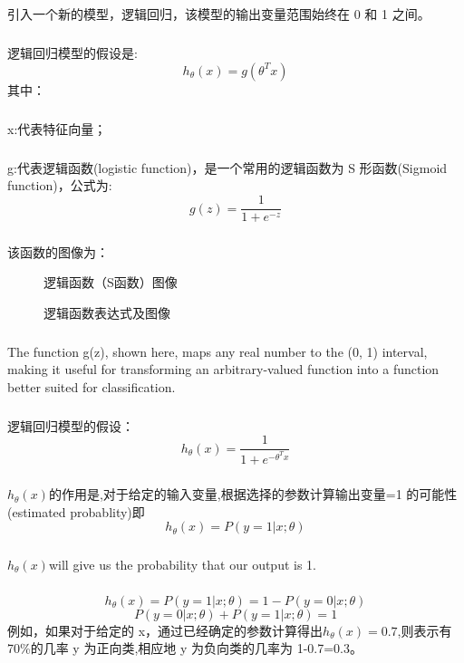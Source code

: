 \documentclass{article}
\begin{document}
\begin{CJK}{UTF8}{gbsn}
\subparagraph{}
引入一个新的模型，逻辑回归，该模型的输出变量范围始终在 0 和 1 之间。
\subparagraph{}
逻辑回归模型的假设是:
\begin{equation}
h_\theta(x)=g(\theta^Tx)
\end{equation}
其中：
\subparagraph{}
x:代表特征向量；
\subparagraph{}
g:代表逻辑函数(logistic function)，是一个常用的逻辑函数为 S 形函数(Sigmoid function)，公式为:
\begin{equation}
g(z)=\frac{1}{1+e^{-z}}
\end{equation}
\subparagraph{}
该函数的图像为：
\begin{figure}[H]
\caption{逻辑函数（S函数）图像}
\label{fig:306}
\end{figure}
\begin{figure}[H]
\caption{逻辑函数表达式及图像}
\label{fig:308}
\end{figure}
\subparagraph{}
The function g(z), shown here, maps any real number to the (0, 1) interval, making it useful for transforming an arbitrary-valued function into a function better suited for classification.
\subparagraph{}
逻辑回归模型的假设：
\begin{equation}
h_\theta(x)=\frac{1}{1+e^{-\theta^Tx}}
\end{equation}
\subparagraph{}
$h_\theta(x)$的作用是,对于给定的输入变量,根据选择的参数计算输出变量=1 的可能性(estimated probablity)即
\begin{equation}
h_\theta(x)=P(y=1|x;\theta)
\end{equation}
\subparagraph{}
$h_\theta(x)$will give us the probability that our output is 1. 
\subparagraph{}
\begin{equation}
h_\theta(x)=P(y=1|x;\theta)=1-P(y=0|x;\theta)
\end{equation}
\begin{equation}
P(y=0|x;\theta)+P(y=1|x;\theta)=1
\end{equation}
例如，如果对于给定的 x，通过已经确定的参数计算得出$h_\theta(x)=0.7$,则表示有 70\%{}的几率 y 为正向类,相应地 y 为负向类的几率为 1-0.7=0.3。

\end{CJK}
\end{document}
